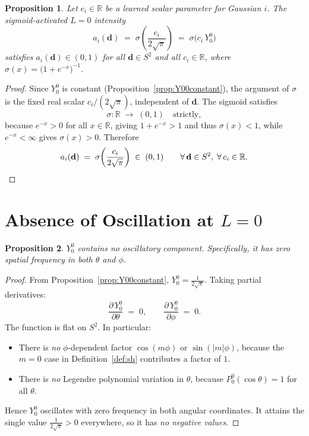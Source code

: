 \documentclass[12pt, a4paper]{article}
\theoremstyle{definition}
\theoremstyle{plain}
\newtheorem{proposition}{Proposition}[section]
\theoremstyle{remark}
\newcommand{\R}{\mathbb{R}}
\newcommand{\Stwo}{S^2}
\begin{document}
\begin{proposition}
\label{prop:nonneg}
Let $c_i\in\R$ be a learned scalar parameter for Gaussian $i$.  The
sigmoid-activated $L=0$ intensity
\[
  a_i(\mathbf{d})
  \;=\;
  \sigma\!\left(\frac{c_i}{2\sqrt{\pi}}\right)
  \;=\;
  \sigma\bigl(c_i\,Y_0^0\bigr)
\]
satisfies $a_i(\mathbf{d})\in(0,1)$ for all $\mathbf{d}\in\Stwo$ and
all $c_i\in\R$, where $\sigma(x)=\bigl(1+e^{-x}\bigr)^{-1}$.
\end{proposition}

\begin{proof}
Since $Y_0^0$ is constant (Proposition~\ref{prop:Y00constant}), the
argument of $\sigma$ is the fixed real scalar $c_i/(2\sqrt{\pi})$,
independent of $\mathbf{d}$.  The sigmoid satisfies
\[
  \sigma : \R \;\longrightarrow\; (0,1) \quad \text{strictly},
\]
because $e^{-x}>0$ for all $x\in\R$, giving $1+e^{-x}>1$ and thus
$\sigma(x)<1$, while $e^{-x}<\infty$ gives $\sigma(x)>0$.  Therefore
\[
  a_i(\mathbf{d})
  \;=\;
  \sigma\!\left(\frac{c_i}{2\sqrt{\pi}}\right)
  \;\in\;(0,1)
  \qquad
  \forall\,\mathbf{d}\in\Stwo,\;\forall\,c_i\in\R.
  \qedhere
\]
\end{proof}

\section{Absence of Oscillation at \texorpdfstring{$L=0$}{L=0}}

\begin{proposition}
\label{prop:nooscill}
$Y_0^0$ contains no oscillatory component.  Specifically, it has zero
spatial frequency in both $\theta$ and $\phi$.
\end{proposition}

\begin{proof}
From Proposition~\ref{prop:Y00constant}, $Y_0^0 = \tfrac{1}{2\sqrt{\pi}}$.
Taking partial derivatives:
\[
  \frac{\partial\,Y_0^0}{\partial\theta} \;=\; 0,
  \qquad
  \frac{\partial\,Y_0^0}{\partial\phi}   \;=\; 0.
\]
The function is flat on $\Stwo$.  In particular:
\begin{itemize}[leftmargin=2em]
  \item There is \emph{no} $\phi$-dependent factor $\cos(m\phi)$ or
        $\sin(|m|\phi)$, because the $m=0$ case in
        Definition~\ref{def:sh} contributes a factor of $1$.
  \item There is \emph{no} Legendre polynomial variation in $\theta$,
        because $P_0^0(\cos\theta)=1$ for all $\theta$.
\end{itemize}
Hence $Y_0^0$ oscillates with zero frequency in both angular
coordinates.  It attains the single value $\tfrac{1}{2\sqrt{\pi}}>0$
everywhere, so it has \emph{no negative values}.
\end{proof}
\end{document}
